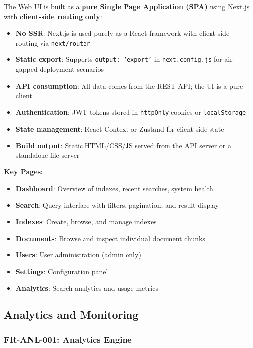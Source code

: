 \documentclass[11pt,a4paper]{article}
\newcommand{\inlinecode}[1]{\texttt{\small\colorbox{ctCodeBg}{#1}}}
\begin{document}
\begin{reqbox}
The Web UI is built as a \textbf{pure Single Page Application (SPA)} using Next.js with \textbf{client-side routing only}:

\begin{itemize}
    \item \textbf{No SSR}: Next.js is used purely as a React framework with client-side routing via \inlinecode{next/router}
    \item \textbf{Static export}: Supports \inlinecode{output: 'export'} in \inlinecode{next.config.js} for air-gapped deployment scenarios
    \item \textbf{API consumption}: All data comes from the REST API; the UI is a pure client
    \item \textbf{Authentication}: JWT tokens stored in \inlinecode{httpOnly} cookies or \inlinecode{localStorage}
    \item \textbf{State management}: React Context or Zustand for client-side state
    \item \textbf{Build output}: Static HTML/CSS/JS served from the API server or a standalone file server
\end{itemize}

\textbf{Key Pages:}
\begin{itemize}
    \item \textbf{Dashboard}: Overview of indexes, recent searches, system health
    \item \textbf{Search}: Query interface with filters, pagination, and result display
    \item \textbf{Indexes}: Create, browse, and manage indexes
    \item \textbf{Documents}: Browse and inspect individual document chunks
    \item \textbf{Users}: User administration (admin only)
    \item \textbf{Settings}: Configuration panel
    \item \textbf{Analytics}: Search analytics and usage metrics
\end{itemize}
\end{reqbox}

\subsection{Analytics and Monitoring}

\subsubsection{FR-ANL-001: Analytics Engine}
\end{document}
